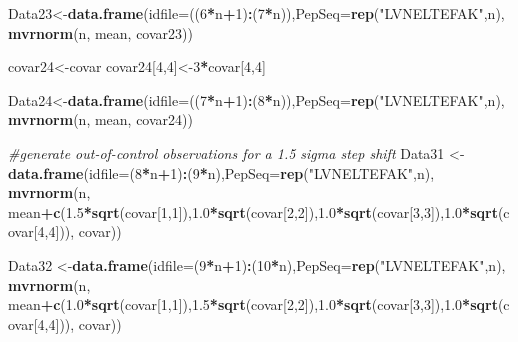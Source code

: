 \documentclass[]{article}
\newenvironment{Shaded}{\begin{snugshade}}{\end{snugshade}}
\newcommand{\KeywordTok}[1]{\textcolor[rgb]{0.13,0.29,0.53}{\textbf{#1}}}
\newcommand{\DataTypeTok}[1]{\textcolor[rgb]{0.13,0.29,0.53}{#1}}
\newcommand{\DecValTok}[1]{\textcolor[rgb]{0.00,0.00,0.81}{#1}}
\newcommand{\FloatTok}[1]{\textcolor[rgb]{0.00,0.00,0.81}{#1}}
\newcommand{\StringTok}[1]{\textcolor[rgb]{0.31,0.60,0.02}{#1}}
\newcommand{\CommentTok}[1]{\textcolor[rgb]{0.56,0.35,0.01}{\textit{#1}}}
\newcommand{\OperatorTok}[1]{\textcolor[rgb]{0.81,0.36,0.00}{\textbf{#1}}}
\newcommand{\NormalTok}[1]{#1}
\begin{document}
\begin{Shaded}
\begin{Highlighting}[]
\NormalTok{Data23<-}\KeywordTok{data.frame}\NormalTok{(}\DataTypeTok{idfile=}\NormalTok{((}\DecValTok{6}\OperatorTok{*}\NormalTok{n}\OperatorTok{+}\DecValTok{1}\NormalTok{)}\OperatorTok{:}\NormalTok{(}\DecValTok{7}\OperatorTok{*}\NormalTok{n)),}\DataTypeTok{PepSeq=}\KeywordTok{rep}\NormalTok{(}\StringTok{"LVNELTEFAK"}\NormalTok{,n),}
                  \KeywordTok{mvrnorm}\NormalTok{(n, mean, }
\NormalTok{                          covar23))}

\NormalTok{covar24<-covar}
\NormalTok{covar24[}\DecValTok{4}\NormalTok{,}\DecValTok{4}\NormalTok{]<-}\DecValTok{3}\OperatorTok{*}\NormalTok{covar[}\DecValTok{4}\NormalTok{,}\DecValTok{4}\NormalTok{]}

\NormalTok{Data24<-}\KeywordTok{data.frame}\NormalTok{(}\DataTypeTok{idfile=}\NormalTok{((}\DecValTok{7}\OperatorTok{*}\NormalTok{n}\OperatorTok{+}\DecValTok{1}\NormalTok{)}\OperatorTok{:}\NormalTok{(}\DecValTok{8}\OperatorTok{*}\NormalTok{n)),}\DataTypeTok{PepSeq=}\KeywordTok{rep}\NormalTok{(}\StringTok{"LVNELTEFAK"}\NormalTok{,n),}
                  \KeywordTok{mvrnorm}\NormalTok{(n, mean, }
\NormalTok{                          covar24))}


\CommentTok{#generate out-of-control observations for a 1.5 sigma step shift }
\NormalTok{Data31 <-}\KeywordTok{data.frame}\NormalTok{(}\DataTypeTok{idfile=}\NormalTok{(}\DecValTok{8}\OperatorTok{*}\NormalTok{n}\OperatorTok{+}\DecValTok{1}\NormalTok{)}\OperatorTok{:}\NormalTok{(}\DecValTok{9}\OperatorTok{*}\NormalTok{n),}\DataTypeTok{PepSeq=}\KeywordTok{rep}\NormalTok{(}\StringTok{"LVNELTEFAK"}\NormalTok{,n),}
                  \KeywordTok{mvrnorm}\NormalTok{(n, mean}\OperatorTok{+}\KeywordTok{c}\NormalTok{(}\FloatTok{1.5}\OperatorTok{*}\KeywordTok{sqrt}\NormalTok{(covar[}\DecValTok{1}\NormalTok{,}\DecValTok{1}\NormalTok{]),}\FloatTok{1.0}\OperatorTok{*}\KeywordTok{sqrt}\NormalTok{(covar[}\DecValTok{2}\NormalTok{,}\DecValTok{2}\NormalTok{]),}\FloatTok{1.0}\OperatorTok{*}\KeywordTok{sqrt}\NormalTok{(covar[}\DecValTok{3}\NormalTok{,}\DecValTok{3}\NormalTok{]),}\FloatTok{1.0}\OperatorTok{*}\KeywordTok{sqrt}\NormalTok{(covar[}\DecValTok{4}\NormalTok{,}\DecValTok{4}\NormalTok{])), }
\NormalTok{                          covar))}

\NormalTok{Data32 <-}\KeywordTok{data.frame}\NormalTok{(}\DataTypeTok{idfile=}\NormalTok{(}\DecValTok{9}\OperatorTok{*}\NormalTok{n}\OperatorTok{+}\DecValTok{1}\NormalTok{)}\OperatorTok{:}\NormalTok{(}\DecValTok{10}\OperatorTok{*}\NormalTok{n),}\DataTypeTok{PepSeq=}\KeywordTok{rep}\NormalTok{(}\StringTok{"LVNELTEFAK"}\NormalTok{,n),}
                  \KeywordTok{mvrnorm}\NormalTok{(n, mean}\OperatorTok{+}\KeywordTok{c}\NormalTok{(}\FloatTok{1.0}\OperatorTok{*}\KeywordTok{sqrt}\NormalTok{(covar[}\DecValTok{1}\NormalTok{,}\DecValTok{1}\NormalTok{]),}\FloatTok{1.5}\OperatorTok{*}\KeywordTok{sqrt}\NormalTok{(covar[}\DecValTok{2}\NormalTok{,}\DecValTok{2}\NormalTok{]),}\FloatTok{1.0}\OperatorTok{*}\KeywordTok{sqrt}\NormalTok{(covar[}\DecValTok{3}\NormalTok{,}\DecValTok{3}\NormalTok{]),}\FloatTok{1.0}\OperatorTok{*}\KeywordTok{sqrt}\NormalTok{(covar[}\DecValTok{4}\NormalTok{,}\DecValTok{4}\NormalTok{])), }
\NormalTok{                          covar))}


\end{Highlighting}
\end{Shaded}
\end{document}
